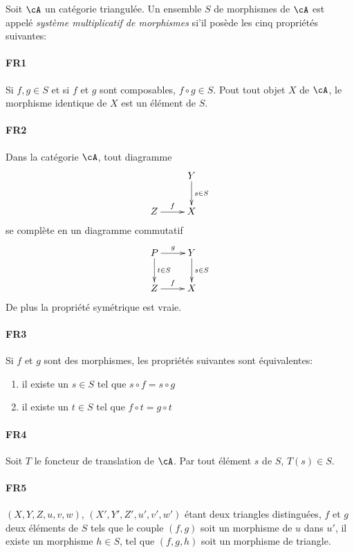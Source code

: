 \begin{definition}
Soit $\cA$ un catégorie triangulée. Un ensemble $S$ de morphismes de $\cA$ 
est appelé \emph{système multiplicatif de morphismes} si'il posède les 
cinq propriétés suivantes: 

\paragraph{FR1}
\hypertarget{VIII:FR1}{}
Si $f,g\in S$ et si $f$ et $g$ sont composables, $f\circ g\in S$. Pout tout 
objet $X$ de $\cA$, le morphisme identique de $X$ est un élément de $S$. 

\paragraph{FR2}
\hypertarget{VIII:FR2}{}
Dans la catégorie $\cA$, tout diagramme 
\[\xymatrix{
  & Y \ar[d]^-{s\in S} \\
  Z \ar[r]^-f 
    & X 
}\]
se complète en un diagramme commutatif 
\[\xymatrix{
  P \ar[r]^-g \ar[d]^-{t\in S} 
    & Y \ar[d]^-{s\in S} \\
  Z \ar[r]^-f 
    & X 
}\]
De plus la propriété symétrique est vraie. 

\paragraph{FR3}
\hypertarget{VIII:FR3}{}
Si $f$ et $g$ sont des morphismes, les propriétés suivantes sont 
équivalentes: 
\begin{enumerate}[\indent i)]
  \item il existe un $s\in S$ tel que $s\circ f=s\circ g$ 
  \item il existe un $t\in S$ tel que $f\circ t=g\circ t$
\end{enumerate}

\paragraph{FR4}
\hypertarget{VIII:FR4}{}
Soit $T$ le foncteur de translation de $\cA$. Par tout élément $s$ de $S$, 
$T(s)\in S$. 

\paragraph{FR5}
\hypertarget{VIII:FR5}{}
$(X,Y,Z,u,v,w)$, $(X',Y',Z',u',v',w')$ étant deux triangles distinguées, 
$f$ et $g$ deux éléments de $S$ tels que le couple $(f,g)$ soit un 
morphisme de $u$ dans $u'$, il existe un morphisme $h\in S$, tel que 
$(f,g,h)$ soit un morphisme de triangle. 
\end{definition}

